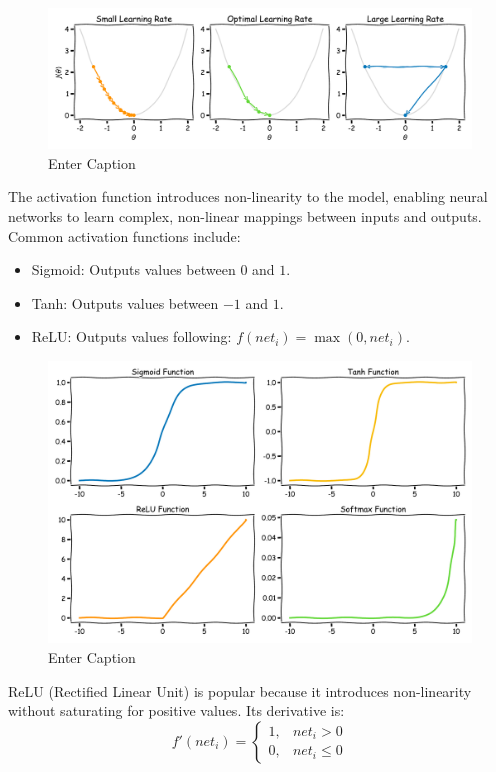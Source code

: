 \begin{figure}
    \centering
    \includegraphics[width=1\linewidth]{LateX//figs/learning_rate.pdf}
    \caption{Enter Caption}
    \label{fig:enter-label}
\end{figure}


The activation function introduces non-linearity to the model, enabling neural networks to learn complex, non-linear mappings between inputs and outputs. Common activation functions include:
\begin{itemize}
    \item Sigmoid: Outputs values between $0$ and $1$.
    \item Tanh: Outputs values between $-1$ and $1$.
    \item ReLU: Outputs values following: $f(\textit{net}_i) = \max(0, \textit{net}_i)$.
\end{itemize}

\begin{figure}
    \centering
    \includegraphics[width=1\linewidth]{LateX//figs/activation_functions_xkcd.pdf}
    \caption{Enter Caption}
    \label{fig:enter-label}
\end{figure}

ReLU (Rectified Linear Unit) is popular because it introduces non-linearity without saturating for positive values. Its derivative is:
\begin{equation}
    f'(\textit{net}_i) =
    \begin{cases}
    1, & \textit{net}_i > 0 \\
    0, & \textit{net}_i \leq 0
    \end{cases}
\end{equation}


